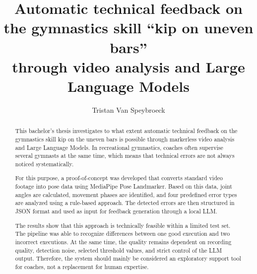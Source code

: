 \documentclass[a0,portrait, english]{hogent-poster}
\title{Automatic technical feedback on the gymnastics skill “kip on uneven bars” \\ through video analysis and Large Language Models}
\author{Tristan Van Speybroeck}
\begin{document}
    
    \maketitle
    
    \begin{abstract}        
        This bachelor's thesis investigates to what extent automatic technical feedback on the gymnastics skill kip on the uneven bars is possible through markerless video analysis and Large Language Models. In recreational gymnastics, coaches often supervise several gymnasts at the same time, which means that technical errors are not always noticed systematically. 
        
        For this purpose, a proof-of-concept was developed that converts standard video footage into pose data using MediaPipe Pose Landmarker. Based on this data, joint angles are calculated, movement phases are identified, and four predefined error types are analyzed using a rule-based approach. The detected errors are then structured in JSON format and used as input for feedback generation through a local LLM. 
        
        The results show that this approach is technically feasible within a limited test set. The pipeline was able to recognize differences between one good execution and two incorrect executions. At the same time, the quality remains dependent on recording quality, detection noise, selected threshold values, and strict control of the LLM output. Therefore, the system should mainly be considered an exploratory support tool for coaches, not a replacement for human expertise.
    \end{abstract}
    
\end{document}
